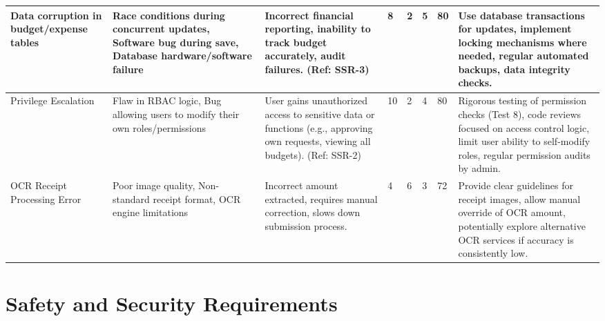 \documentclass{article}
\begin{document}
\begin{longtable}{|p{2.2cm}|p{2.2cm}|p{3cm}|p{0.6cm}|p{0.6cm}|p{0.6cm}|p{0.6cm}|p{3.5cm}|}
Data corruption in budget/expense tables & Race conditions during concurrent updates, Software bug during save, Database hardware/software failure & Incorrect financial reporting, inability to track budget accurately, audit failures. (Ref: SSR-3) & 8 & 2 & 5 & 80 & Use database transactions for updates, implement locking mechanisms where needed, regular automated backups, data integrity checks. \\
\hline

Privilege Escalation & Flaw in RBAC logic, Bug allowing users to modify their own roles/permissions & User gains unauthorized access to sensitive data or functions (e.g., approving own requests, viewing all budgets). (Ref: SSR-2) & 10 & 2 & 4 & 80 & Rigorous testing of permission checks (Test 8), code reviews focused on access control logic, limit user ability to self-modify roles, regular permission audits by admin. \\
\hline

OCR Receipt Processing Error & Poor image quality, Non-standard receipt format, OCR engine limitations & Incorrect amount extracted, requires manual correction, slows down submission process. & 4 & 6 & 3 & 72 & Provide clear guidelines for receipt images, allow manual override of OCR amount, potentially explore alternative OCR services if accuracy is consistently low. \\
\hline

\end{longtable}

\section{Safety and Security Requirements}
\end{document}
